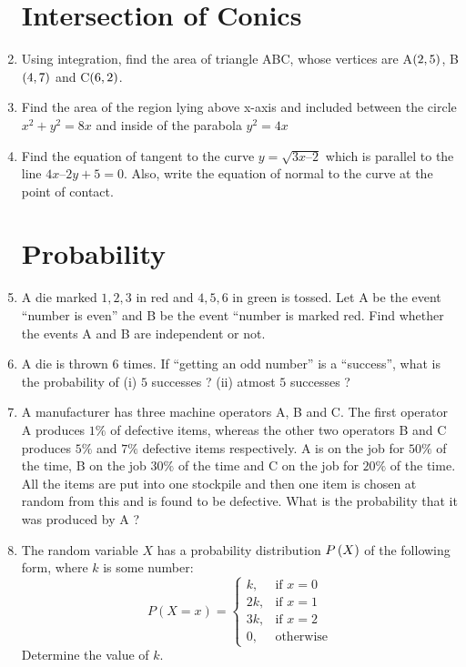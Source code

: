 \documentclass{article}
\begin{document}
\begin{enumerate}
\section{Intersection of Conics}
\item Using integration, find the area of triangle ABC, whose vertices are A$\left(2, 5\right)$, B$\left(4, 7\right)$ and C$\left(6, 2\right)$.
\item Find the area of the region lying above x-axis and included between the circle $x^2+y^2 = 8x$ and inside of the parabola $ y^2 = 4x$
\item Find the equation of tangent to the curve $y=\sqrt{3x – 2} $ which is parallel to the line $ 4x – 2y + 5 = 0$. Also, write the equation of normal to the curve at the point of contact.
\section{Probability}
\item A die marked $1, 2, 3 $ in red and $4,5,6 $ in green is tossed. Let A be the event “number is even” and B be the event “number is marked red. Find whether the events A and B are independent or not.
\item A die is thrown $6$ times. If “getting an odd number” is a “success”, what is the probability of (i) $5$ successes ? (ii) atmost $5$ successes ?
\item A manufacturer has three machine operators A, B and C. The first operator A produces $1\%$ of defective items, whereas the other two operators B and C produces $5\%$ and $7\%$ defective items respectively. A is on the job for $50\%$ of the time, B on the job $30\%$ of the time and C on the job for $20\%$ of the time. All the items are put into one stockpile and then one item is chosen at random from this and is found to be defective. What is the probability that it was produced by A ?
\item The random variable $X$ has a probability distribution $P\left(X\right)$ of the following form, where $k$ is some number:
\[P(X = x) = \begin{cases}
    k, & \text{if } x = 0 \\
    2k, & \text{if } x = 1 \\
    3k, & \text{if } x = 2 \\
    0, & \text{otherwise}
\end{cases}\] 
Determine the value of $k$.

\end{enumerate}
\end{document}
